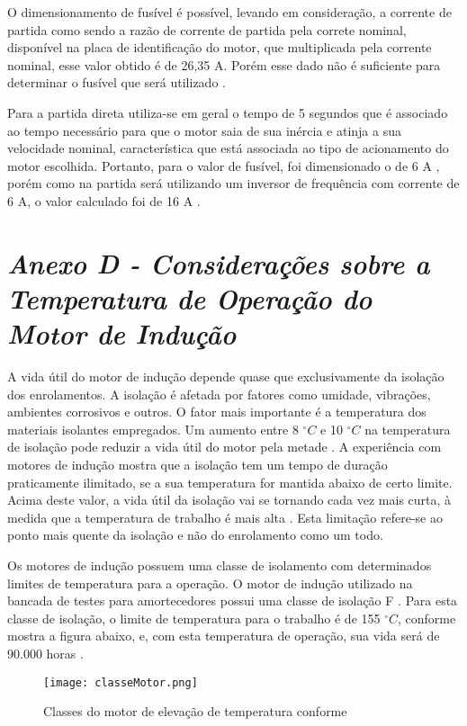		O dimensionamento de fusível é possível, levando em consideração, a corrente de partida como sendo a razão de corrente de partida pela correte nominal, disponível na placa de identificação do motor, que multiplicada pela corrente nominal, esse valor obtido é de 26,35 A. Porém esse dado não é suficiente para determinar o fusível que será utilizado \cite{WEG04}.
		
		Para a partida direta utiliza-se em geral o tempo de 5 segundos que é associado ao tempo necessário para que o motor saia de sua inércia e atinja a sua velocidade nominal, característica que está associada ao tipo de acionamento do motor escolhida. Portanto, para o valor de fusível, foi dimensionado o de 6 A , porém como na partida será utilizando um inversor de frequência com corrente de 6 A, o valor calculado foi de 16 A \cite{WEG04} \cite{NBR5410}.


	\newpage
	\section[Anexo D]{\emph{Anexo D - Considerações sobre a Temperatura de Operação do Motor de Indução}}
	\label{sec:anexoD}

		A vida útil do motor de indução depende quase que exclusivamente da isolação dos enrolamentos. A isolação é afetada por fatores como umidade, vibrações, ambientes corrosivos e outros. O fator mais importante é a temperatura dos materiais isolantes empregados. Um aumento entre 8 $^{\circ}C$ e 10 $^{\circ}C$ na temperatura de isolação pode reduzir a vida útil do motor pela metade \cite{Goncalez}. A experiência com motores de indução mostra que a isolação tem um tempo de duração praticamente ilimitado, se a sua temperatura for mantida abaixo de certo limite. Acima deste valor, a vida útil da isolação vai se tornando cada vez mais curta, à medida que a temperatura de trabalho é mais alta \cite{Goncalez}. Esta limitação refere-se ao ponto mais quente da isolação e não do enrolamento como um todo.
	
		Os motores de indução possuem uma classe de isolamento com determinados limites de temperatura para a operação. O motor de indução utilizado na bancada de testes para amortecedores possui uma classe de isolação F \cite{Voges}. Para esta classe de isolação, o limite de temperatura para o trabalho é de 155 $^{\circ}C$, conforme mostra a figura abaixo, e, com esta temperatura de operação, sua vida será de 90.000 horas \cite{ABNT17094}.

		\begin{figure}[!h]
			\centering
			\texttt{[image: classeMotor.png]}
			\caption[Classes do motor de elevação de temperatura conforme NBR 17094:2003]{Classes do motor de elevação de temperatura conforme \cite{ABNT17094}} 
			\label{classeMotor}
		\end{figure}


